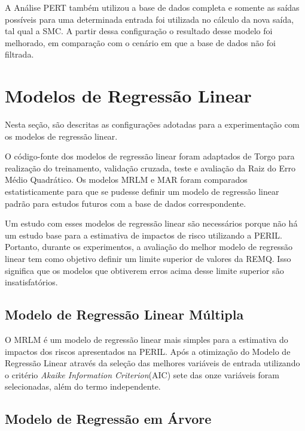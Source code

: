 A Análise PERT também utilizou a base de dados completa e somente as saídas possíveis para uma determinada entrada foi utilizada no cálculo da nova saída, tal qual a SMC. A partir dessa configuração o resultado desse modelo foi melhorado, em comparação com o cenário em que a base de dados não foi filtrada.

\section{Modelos de Regressão Linear}

Nesta seção, são descritas as configurações adotadas para a experimentação com os modelos de regressão linear. 

O código-fonte dos modelos de regressão linear foram adaptados de Torgo \cite{torgo2003data} para realização do treinamento, validação cruzada, teste e avaliação da Raiz do Erro Médio Quadrático. Os modelos MRLM e MAR foram comparados estatisticamente para que se pudesse definir um modelo de regressão linear padrão para estudos futuros com a base de dados correspondente.

Um estudo com esses modelos de regressão linear são necessários porque não há um estudo base para a estimativa de impactos de risco utilizando a PERIL. Portanto, durante os experimentos, a avaliação do melhor modelo de regressão linear tem como objetivo definir um limite superior de valores da REMQ. Isso significa que os modelos que obtiverem erros acima desse limite superior são insatisfatórios.

\subsection{Modelo de Regressão Linear Múltipla}

O MRLM é um  modelo de regressão linear mais simples para a estimativa do impactos dos riscos apresentados na PERIL. Após a otimização do Modelo de Regressão Linear através da seleção das melhores variáveis de entrada utilizando o critério \textit{Akaike Information Criterion}(AIC) sete das onze variáveis foram selecionadas, além do termo independente.

\subsection{Modelo de Regressão em Árvore}

